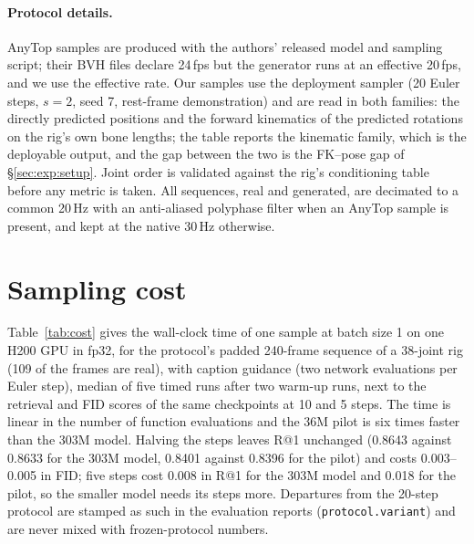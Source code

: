 \paragraph{Protocol details.} AnyTop samples are produced with the authors' released model and
sampling script; their BVH files declare 24\,fps but the generator runs at an effective 20\,fps, and
we use the effective rate. Our samples use the deployment sampler (20 Euler steps, $s{=}2$, seed 7,
rest-frame demonstration) and are read in both families: the directly predicted positions and the
forward kinematics of the predicted rotations on the rig's own bone lengths; the table reports the
kinematic family, which is the deployable output, and the gap between the two is the FK--pose gap of
\S\ref{sec:exp:setup}. Joint order is validated against the rig's conditioning table before any
metric is taken. All sequences, real and generated, are decimated to a common 20\,Hz with an
anti-aliased polyphase filter when an AnyTop sample is present, and kept at the native 30\,Hz
otherwise.\section{Sampling cost}\label{app:cost}

Table~\ref{tab:cost} gives the wall-clock time of one sample at batch size 1 on one H200 GPU in fp32, for the
protocol's padded 240-frame sequence of a 38-joint rig (\num{109} of the frames are real), with caption
guidance (two network evaluations per Euler step), median of five timed runs after two warm-up runs, next to the
retrieval and FID scores of the same checkpoints at 10 and 5 steps. The time is linear in the number of function
evaluations and the \num{36}M pilot is six times faster than the \num{303}M model. Halving the steps leaves R@1
unchanged (\num{0.8643} against \num{0.8633} for the \num{303}M model, \num{0.8401} against \num{0.8396} for the
pilot) and costs \num{0.003}--\num{0.005} in FID; five steps cost \num{0.008} in R@1 for the \num{303}M model and
\num{0.018} for the pilot, so the smaller model needs its steps more.
Departures from the 20-step protocol are stamped as such in the evaluation reports (\texttt{protocol.variant}) and
are never mixed with frozen-protocol numbers.

